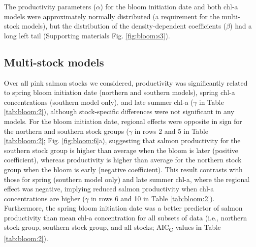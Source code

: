 The productivity parameters (\(\alpha\)) for the bloom initiation date and both
chl-a models were approximately normally distributed (a requirement for the
multi-stock models), but the distribution of the density-dependent coefficients
(\(\beta\)) had a long left tail (Supporting materials Fig. \ref{fig:bloom:s3}).


\subsection{Multi-stock models}

Over all pink salmon stocks we considered, productivity was significantly
related to spring bloom initiation date (northern and southern models), spring
chl-a concentrations (southern model only), and late summer chl-a (\(\gamma\) in
Table \ref{tab:bloom:2}), although stock-specific differences were not
significant in any models. For the bloom initiation date, regional effects were
opposite in sign for the northern and southern stock groups (\(\gamma\) in rows
2 and 5 in Table \ref{tab:bloom:2}; Fig. \ref{fig:bloom:6}a), suggesting that
salmon productivity for the southern stock group is higher than average when the
bloom is later (positive coefficient), whereas productivity is higher than
average for the northern stock group when the bloom is early (negative
coefficient). This result contrasts with those for spring (southern model only)
and late summer chl-a, where the regional effect was negative, implying reduced
salmon productivity when chl-a concentrations are higher (\(\gamma\) in rows 6
and 10 in Table \ref{tab:bloom:2}). Furthermore, the spring bloom initiation
date was a better predictor of salmon productivity than mean chl-a concentration
for all subsets of data (i.e., northern stock group, southern stock group, and
all stocks; AIC\textsubscript{C} values in Table \ref{tab:bloom:2}).

